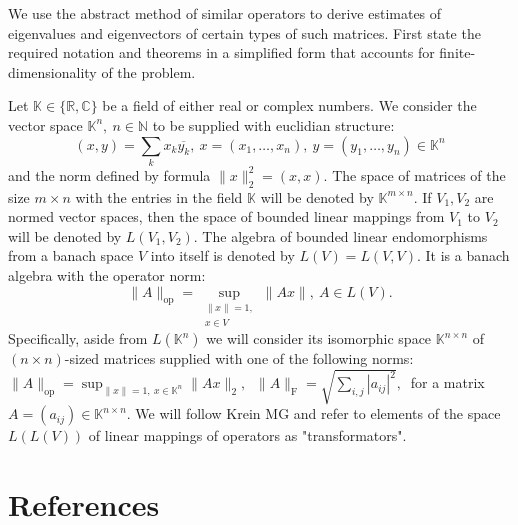 \documentclass[a4paper]{jpconf}
\begin{document}
We use the abstract method of similar operators
    to derive estimates of eigenvalues and eigenvectors
    of certain types of such matrices.
First state the required notation and theorems
    in a simplified form that accounts for finite-dimensionality
    of the problem.

Let \( \mathbb{K}\in \{ \mathbb{R}, \mathbb{C} \} \)
    be a field of either real or complex numbers.
We consider the vector space \( \mathbb{K}^n,\ n\in \mathbb{N} \)
    to be supplied with euclidian structure:
    \[
        (x, y){=}\sum_k x_k\overline{y_k},
        \ x{=}(x_1,\ldots, x_n),
        \ y=(y_1,\ldots, y_n)
        \in \mathbb{K}^n
        \]
    and the norm defined by formula
    \(
        \|x\|_2^2{=}(x,x).
        \)
The space of matrices of the size \( m{\times}n \)
    with the entries in the field \( \mathbb{K} \)
    will be denoted by \( \mathbb{K}^{m{\times}n} \).
If \( V_1, V_2 \) are normed vector spaces,
    then the space of bounded linear mappings
    from \( V_1 \) to \( V_2 \)
    will be denoted by \( L(V_1, V_2) \).
The algebra of bounded linear endomorphisms
    from a banach space \( V \)
    into itself
    is denoted by \( L(V) = L(V, V) \).
It is a banach algebra with the operator norm:
    \[
        \|A\|_{\mathrm{op}} =
        \sup_{\substack{\|x\|=1,\\ x\in V}} \|A x\|,\ A\in L(V).
        \]
Specifically, aside from \( L(\mathbb{K}^n) \)
    we will consider its isomorphic
    space \( \mathbb{K}^{n{\times}n} \)
    of \( (n{\times}n) \)-sized matrices
    supplied with one of the following norms:
    \( \|A\|_{\mathrm{op}} = \sup_{\|x\|=1,\ x\in \mathbb{K}^n} \|A x\|_2,\ \)
    \( \|A\|_{\mathrm{F}} = \sqrt{\sum_{i,j} |a_{ij}|^2},\ \)
    for a matrix 
    \( A{=}(a_{ij})\in\mathbb{K}^{n\times n} \).
We will follow {Krein MG}
    and refer to elements of the space \( L(L(V)) \)
    of linear mappings of operators
    as "transformators".
\section*{References}

{}
\end{document}
